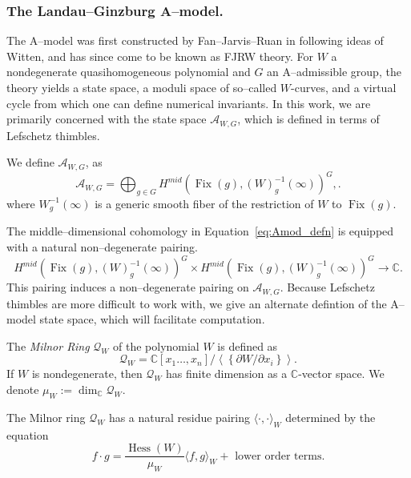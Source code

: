 \documentclass[10pt, letterpaper]{amsart}
\theoremstyle{remark}
\newcommand{\CC}{\mathbb C}
\newcommand{\sA}{\mathscr{A}}
\newcommand{\sQ}{\mathscr{Q}}
\newcommand{\defital}{\textit}
\DeclareMathOperator{\Hess}{Hess}
\DeclareMathOperator{\Fix}{Fix}
\begin{document}
\subsubsection*{The Landau--Ginzburg A--model.} The A--model was first constructed by Fan--Jarvis--Ruan in \cite{FJR13} following ideas of Witten, and has since come to be known as FJRW theory. For $W$ a nondegenerate quasihomogeneous polynomial and $G$ an A--admissible group, the theory yields a state space, a moduli space of so--called $W$-curves, and a virtual cycle from which one can define numerical invariants. In this work, we are primarily concerned with the state space $\sA_{W,G}$, which is defined in terms of Lefschetz thimbles.

We define $\sA_{W,G}$, as %
\begin{equation}\label{e:Aspace}
\sA_{W,G} = \bigoplus_{g \in G} H^{mid} (\Fix(g),(W)_g^{-1}( \infty))^G,.
\end{equation}
where $W_g^{-1}(\infty)$ is a generic smooth fiber of the restriction of $W$ to $\Fix(g)$.

The middle--dimensional cohomology in Equation~\ref{eq:Amod_defn} is equipped with a natural non--degenerate pairing.
\[
H^{mid} (\Fix(g),(W)_g^{-1}( \infty))^G \times H^{mid} (\Fix(g),(W)_g^{-1}( \infty))^G\to \CC. 
\]
This pairing induces a non--degenerate pairing on $\sA_{W,G}$. Because Lefschetz thimbles are more difficult to work with, we give an alternate defintion of the A--model state space, which will facilitate computation. 

The \defital{Milnor Ring} $\sQ_W$ of the polynomial $W$ is defined as 
\[
\sQ_W =\CC[x_1 \ldots, x_n]/
\left\langle\left\{\partial W/\partial x_i\right\}\right\rangle.
\]
If $W$ is nondegenerate, then $\sQ_W$ has finite dimension as a $\CC$-vector space. We denote $\mu_W:=\dim_\CC \sQ_W$. 

The Milnor ring $\sQ_W$ has a natural residue pairing $\langle \cdot , \cdot\rangle_W$ determined by the equation 
 \begin{equation}\label{e:milpairing}
f\cdot g =  \frac{\Hess(W)}{\mu_W}\langle f, g\rangle_W+ \text{ lower order terms}.%
 \end{equation}
\end{document}
